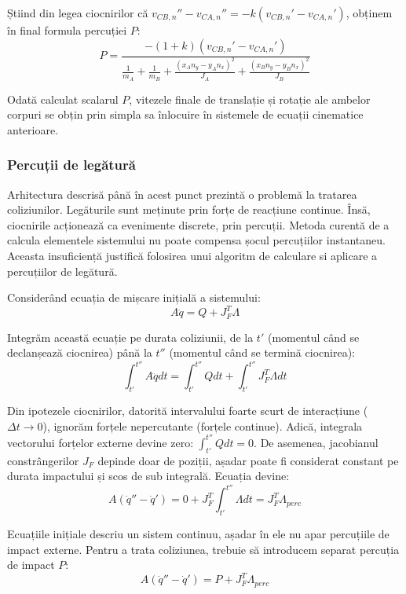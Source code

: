\documentclass[12pt, a4paper]{article}
\begin{document}
Știind din legea ciocnirilor că $v_{CB,n}'' - v_{CA,n}'' = -k (v_{CB,n}' - v_{CA,n}')$, obținem în final formula percuției $P$:
\begin{equation}
    P = \frac{-(1 + k) (v_{CB,n}' - v_{CA,n}')}{\frac{1}{m_A} + \frac{1}{m_B} + \frac{(x_A n_y - y_A n_x)^2}{J_A} + \frac{(x_B n_y - y_B n_x)^2}{J_B}}
\end{equation}

Odată calculat scalarul $P$, vitezele finale de translație și rotație ale ambelor corpuri se obțin prin simpla sa înlocuire în sistemele de ecuații cinematice anterioare.
\subsubsection{Percuții de legătură}

    Arhitectura descrisă până în acest punct prezintă o problemă la tratarea coliziunilor. Legăturile sunt meținute prin forțe de reacțiune continue. Însă, ciocnirile acționează ca evenimente discrete, prin percuții. Metoda curentă de a calcula elementele sistemului nu poate compensa șocul percuțiilor instantaneu. Aceasta insuficiență justifică folosirea unui algoritm de calculare si aplicare a percuțiilor de legătură.

    Considerând ecuația de mișcare inițială a sistemului:
\begin{equation}
    A\ddot{q} = Q + J_F^T \Lambda
\end{equation}

Integrăm această ecuație pe durata coliziunii, de la $t'$ (momentul când se declanșează ciocnirea) până la $t''$ (momentul când se termină ciocnirea):
\begin{equation}
    \int_{t'}^{t''} A\ddot{q} dt = \int_{t'}^{t''} Q dt + \int_{t'}^{t''} J_F^T \Lambda dt
\end{equation}

Din ipotezele ciocnirilor, datorită intervalului foarte scurt de interacțiune ($\Delta t \to 0$), ignorăm forțele nepercutante (forțele continue). Adică, integrala vectorului forțelor externe devine zero: $\int_{t'}^{t''} Q dt = 0$. De asemenea, jacobianul constrângerilor $J_F$ depinde doar de poziții, așadar poate fi considerat constant pe durata impactului și scos de sub integrală. Ecuația devine:
\begin{equation}
    A(\dot{q}'' - \dot{q}') = 0 + J_F^T \int_{t'}^{t''} \Lambda dt = J_F^T \Lambda_{perc}
\end{equation}

Ecuațiile inițiale descriu un sistem continuu, așadar în ele nu apar percuțiile de impact externe. Pentru a trata coliziunea, trebuie să introducem separat percuția de impact $P$:
\begin{equation}
    A(\dot{q}'' - \dot{q}') = P + J_F^T \Lambda_{perc}
\end{equation}
\end{document}
